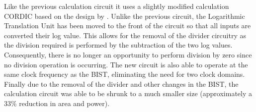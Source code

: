 \documentclass[12pt]{report}
\begin{document}
Like the previous calculation circuit it uses a slightly modified calculation CORDIC based on the design by \cite{joey}.  Unlike the previous circuit, the Logarithmic Translation Unit has been moved to the front of the circuit so that all inputs are converted their log value.  This allows for the removal of the divider circuitry as the division required is performed by the subtraction of the two log values.  Consequently, there is no longer an opportunity to perform division by zero since no division operation is occurring.  The new circuit is also able to operate at the same clock frequency as the BIST, eliminating the need for two clock domains.  Finally due to the removal of the divider and other changes in the BIST, the calculation circuit was able to be shrunk to a much smaller size (approximately a 33\% reduction in area and power).
\end{document}
